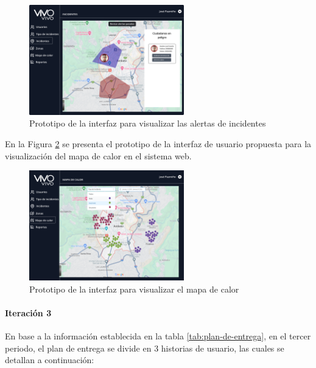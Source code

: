 \begin{figure}[H]
      \centering
      \includegraphics[width=0.6\textwidth]{chapters/III-resultados-y-discusion/resources/images/prototipo-mapa-incidentes-web.png}
      \caption{Prototipo de la interfaz para visualizar las alertas de incidentes}
      \label{fig:prototipo-interfaz-usuario-web-8}
\end{figure}

En la Figura \ref{fig:prototipo-interfaz-usuario-web-9} se presenta el prototipo de la interfaz de usuario propuesta para
la visualización del mapa de calor en el sistema web.

\begin{figure}[H]
      \centering
      \includegraphics[width=0.6\textwidth]{chapters/III-resultados-y-discusion/resources/images/prototipo-mapa-de-calor-web.png}
      \caption{Prototipo de la interfaz para visualizar el mapa de calor}
      \label{fig:prototipo-interfaz-usuario-web-9}
\end{figure}

\paragraph{Iteración 3}

En base a la información establecida en la tabla \ref{tab:plan-de-entrega}, en el tercer periodo, el plan de
entrega se divide en 3 historias de usuario, las cuales se detallan a continuación:

